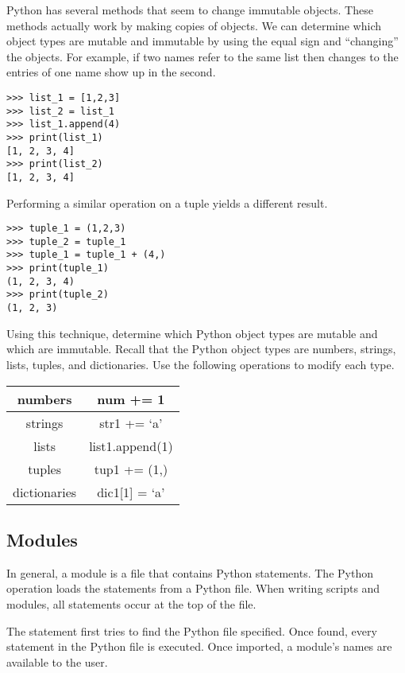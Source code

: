 \begin{problem}
Python has several methods that seem to change immutable objects.
These methods actually work by making copies of objects. We can determine which object types are mutable and immutable by using the equal sign and ``changing'' the objects.
For example, if two names refer to the same list then changes to the entries of one name show up in the second.

\begin{lstlisting}
>>> list_1 = [1,2,3]
>>> list_2 = list_1
>>> list_1.append(4)
>>> print(list_1)
[1, 2, 3, 4]
>>> print(list_2)
[1, 2, 3, 4]
\end{lstlisting}

Performing a similar operation on a tuple yields a different result.
\begin{lstlisting}
>>> tuple_1 = (1,2,3)
>>> tuple_2 = tuple_1
>>> tuple_1 = tuple_1 + (4,)
>>> print(tuple_1)
(1, 2, 3, 4)
>>> print(tuple_2)
(1, 2, 3)
\end{lstlisting}

Using this technique, determine which Python object types are mutable and which are immutable.
Recall that the Python object types are numbers, strings, lists, tuples, and dictionaries.
Use the following operations to modify each type.
\begin{center}
\begin{tabular}{|c|c|}
\hline
numbers & num += 1 \\
\hline
strings & str1 += `a' \\
\hline
lists & list1.append(1) \\
\hline
tuples & tup1 += (1,) \\
\hline
dictionaries & dic1[1] = `a' \\
\hline
\end{tabular}
\end{center}
\end{problem}

\subsection*{Modules}

In general, a module is a file that contains Python statements.
The Python  operation loads the statements from a Python file.
When writing scripts and modules, all  statements occur at the top of the file.

The  statement first tries to find the Python file specified.
Once found, every statement in the Python file is executed.
Once imported, a module's names are available to the user.

